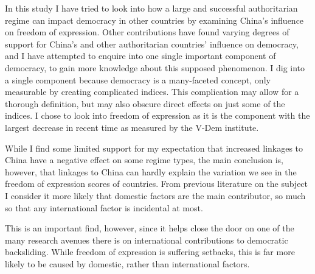 In this study I have tried to look into how a large and successful authoritarian regime can impact democracy in other countries by examining China's influence on freedom of expression. Other contributions have found varying degrees of support for China's and other authoritarian countries' influence on democracy, and I have attempted to enquire into one single important component of democracy, to gain more knowledge about this supposed phenomenon. I dig into a single component because democracy is a many-faceted concept, only measurable by creating complicated indices. This complication may allow for a thorough definition, but may also obscure direct effects on just some of the indices. I chose to look into freedom of expression as it is the component with the largest decrease in recent time as measured by the V-Dem institute.

While I find some limited support for my expectation that increased linkages to China have a negative effect on some regime types, the main conclusion is, however, that linkages to China can hardly explain the variation we see in the freedom of expression scores of countries. From previous literature on the subject I consider it more likely that domestic factors are the main contributor, so much so that any international factor is incidental at most.

This is an important find, however, since it helps close the door on one of the many research avenues there is on international contributions to democratic backsliding. While freedom of expression is suffering setbacks, this is far more likely to be caused by domestic, rather than international factors. 